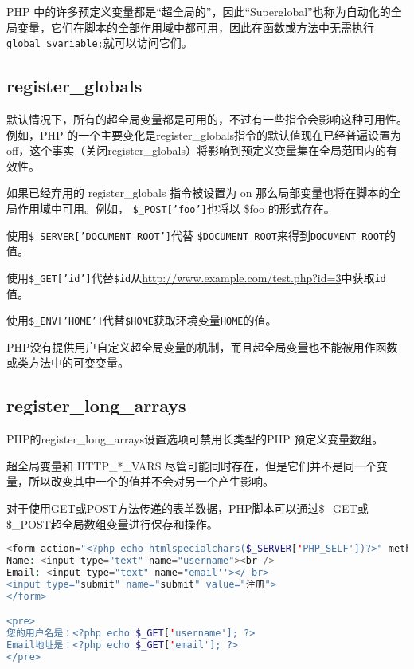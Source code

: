 PHP 中的许多预定义变量都是“超全局的”，因此“Superglobal”也称为自动化的全局变量，它们在脚本的全部作用域中都可用，因此在函数或方法中无需执行\texttt{global \$variable;}就可以访问它们。

\subsection{register\_globals}

默认情况下，所有的超全局变量都是可用的，不过有一些指令会影响这种可用性。例如，PHP 的一个主要变化是register\_globals指令的默认值现在已经普遍设置为 off，这个事实（关闭register\_globals）将影响到预定义变量集在全局范围内的有效性。

如果已经弃用的 register\_globals 指令被设置为 on 那么局部变量也将在脚本的全局作用域中可用。例如， \texttt{\$\_POST['foo']}也将以 \$foo 的形式存在。


\begin{compactitem}
\item 使用\texttt{\$\_SERVER['DOCUMENT\_ROOT']}代替 \texttt{\$DOCUMENT\_ROOT}来得到\texttt{DOCUMENT\_ROOT}的值。
\item 使用\texttt{\$\_GET['id']}代替\texttt{\$id}从\url{http://www.example.com/test.php?id=3}中获取\texttt{id}值。
\item 使用\texttt{\$\_ENV['HOME']}代替\texttt{\$HOME}获取环境变量\texttt{HOME}的值。
\end{compactitem}



PHP没有提供用户自定义超全局变量的机制，而且超全局变量也不能被用作函数或类方法中的可变变量。

\subsection{register\_long\_arrays}


PHP的register\_long\_arrays设置选项可禁用长类型的PHP 预定义变量数组。

超全局变量和 HTTP\_*\_VARS 尽管可能同时存在，但是它们并不是同一个变量，所以改变其中一个的值并不会对另一个产生影响。


对于使用GET或POST方法传递的表单数据，PHP脚本可以通过\$\_GET或\$\_POST超全局数组变量进行保存和操作。

\begin{lstlisting}[language=PHP]
<form action="<?php echo htmlspecialchars($_SERVER['PHP_SELF'])?>" method="get">
Name: <input type="text" name="username"><br />
Email: <input type="text" name="email''></ br>
<input type="submit" name="submit" value="注册">
</form>

<pre>
您的用户名是：<?php echo $_GET['username']; ?>
Email地址是：<?php echo $_GET['email']; ?>
</pre>
\end{lstlisting}

